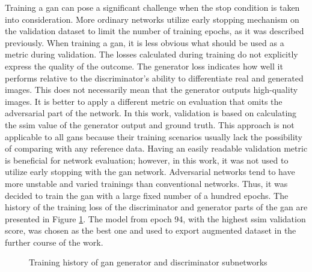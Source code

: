 Training a \gls{gan} can pose a significant challenge when the stop condition is taken into consideration.
More ordinary networks utilize early stopping mechanism on the validation dataset to limit the number of training epochs, as it was described previously.
When training a \gls{gan}, it is less obvious what should be used as a metric during validation.
The losses calculated during training do not explicitly express the quality of the outcome.
The generator loss indicates how well it performs relative to the discriminator's ability to differentiate real and generated images.
This does not necessarily mean that the generator outputs high-quality images.
It is better to apply a different metric on evaluation that omits the adversarial part of the network.
In this work, validation is based on calculating the \gls{ssim} value of the generator output and ground truth.
This approach is not applicable to all \gls{gan}s because their training scenarios usually lack the possibility of comparing with any reference data.
Having an easily readable validation metric is beneficial for network evaluation; however, in this work, it was not used to utilize early stopping with the \gls{gan} network.
Adversarial networks tend to have more unstable and varied trainings than conventional networks.
Thus, it was decided to train the \gls{gan} with a large fixed number of a hundred epochs.
The history of the training loss of the discriminator and generator parts of the \gls{gan} are presented in Figure \ref{fig:gan-train-hist}.
The model from epoch 94, with the highest \gls{ssim} validation score, was chosen as the best one and used to export augmented dataset in the further course of the work.
\begin{figure}
    \centering
    \caption{Training history of \gls{gan} generator and discriminator subnetworks}
    \label{fig:gan-train-hist}
\end{figure}

